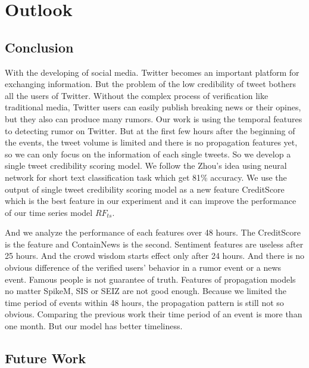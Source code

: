 \chapter{Outlook} %
\label{cha:conclusion_and_future_work}


\section{Conclusion}
\vspace{-2mm}
With the developing of social media. Twitter becomes an important platform for exchanging information. But the problem of the low credibility of tweet bothers all the users of Twitter. Without the complex process of verification like traditional media, Twitter users can easily publish breaking news or their opines, but they also can produce many rumors. Our work is using the temporal features to detecting rumor on Twitter. But at the first few hours after the beginning of the events, the tweet volume is limited and there is no propagation features yet, so we can only focus on the information of each single tweets. So we develop a single tweet credibility scoring model. We follow the Zhou's idea using neural network for short text classification task which get 81\% accuracy. We use the output of single tweet credibility scoring model as a new feature CreditScore which is the best feature in our experiment and it can improve the performance of our time series model $RF_{ts}$. 

And we analyze the performance of each features over 48 hours. The CreditScore is the feature and ContainNews is the second. Sentiment features are useless after 25 hours. And the crowd wisdom starts effect only after 24 hours. And there is no obvious difference of the verified users' behavior in a rumor event or a news event. Famous people is not guarantee of truth. Features of propagation models no matter SpikeM, SIS or SEIZ are not good enough. Because we limited the time period of events within 48 hours, the propagation pattern is still not so obvious. Comparing the previous work their time period of an event is more than one month. But our model has better timeliness.



\section{Future Work} %
\label{sec:future_work}

